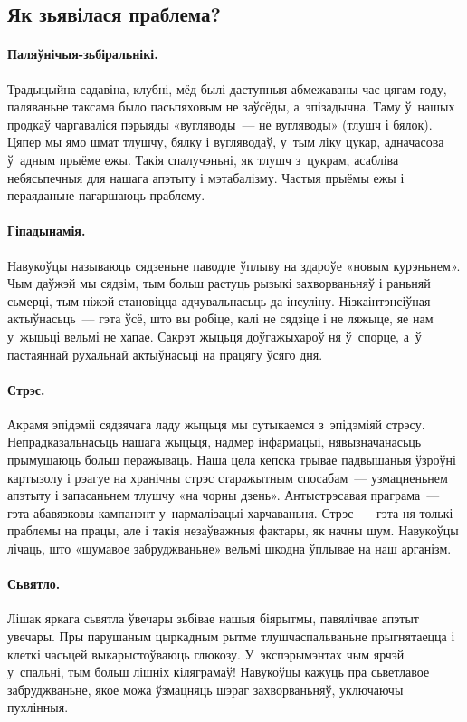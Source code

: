 \subsection{Як зьявілася праблема?}

\paragraph{Паляўнічыя-зьбіральнікі.}
Традыцыйна садавіна, клубні, мёд былі даступныя абмежаваны час цягам году, паляваньне таксама было пасьпяховым не заўсёды, а~эпізадычна. Таму ў~нашых продкаў чаргаваліся пэрыяды «вугляводы~--- не вугляводы» (тлушч і бялок). Цяпер мы ямо шмат тлушчу, бялку і вугляводаў, у~тым ліку цукар, адначасова ў~адным прыёме ежы. Такія спалучэньні, як тлушч з~цукрам, асабліва небясьпечныя для нашага апэтыту і мэтабалізму. Частыя прыёмы ежы і пераяданьне пагаршаюць праблему.

\paragraph{Гіпадынамія.}
Навукоўцы называюць сядзеньне паводле ўплыву на здароўе «новым курэньнем». Чым даўжэй мы сядзім, тым больш растуць рызыкі захворваньняў і раньняй сьмерці, тым ніжэй становіцца адчувальнасьць да інсуліну. Нізкаінтэнсіўная актыўнасьць~--- гэта ўсё, што вы робіце, калі не сядзіце і не ляжыце, яе нам у~жыцьці вельмі не хапае. Сакрэт жыцьця доўгажыхароў ня ў~спорце, а~ў пастаяннай рухальнай актыўнасьці на працягу ўсяго дня.

\paragraph{Стрэс.}
Акрамя эпідэміі сядзячага ладу жыцьця мы сутыкаемся з~эпідэміяй стрэсу. Непрадказальнасьць нашага жыцьця, надмер інфармацыі, нявызначанасьць прымушаюць больш перажываць. Наша цела кепска трывае падвышаныя ўзроўні картызолу і рэагуе на хранічны стрэс старажытным спосабам~--- узмацненьнем апэтыту і запасаньнем тлушчу «на чорны дзень». Антыстрэсавая праграма~--- гэта абавязковы кампанэнт у~нармалізацыі харчаваньня. Стрэс~--- гэта ня толькі праблемы на працы, але і такія незаўважныя фактары, як начны шум. Навукоўцы лічаць, што «шумавое забруджваньне» вельмі шкодна ўплывае на наш арганізм.

\paragraph{Сьвятло.}
Лішак яркага сьвятла ўвечары зьбівае нашыя біярытмы, павялічвае апэтыт увечары. Пры парушаным цыркадным рытме тлушчаспальваньне прыгнятаецца і клеткі часьцей выкарыстоўваюць глюкозу. У~экспэрымэнтах чым ярчэй у~спальні, тым больш лішніх кіляграмаў! Навукоўцы кажуць пра сьветлавое забруджваньне, якое можа ўзмацняць шэраг захворваньняў, уключаючы пухлінныя.


